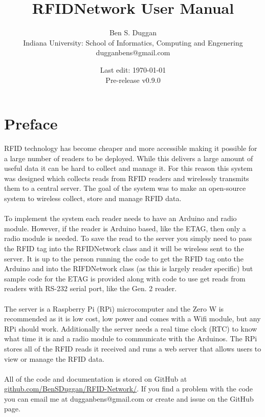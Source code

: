 \documentclass[12pt]{article}
\begin{document}
\begin{titlepage}
	\title{RFIDNetwork User Manual}
	\author{Ben S. Duggan\\Indiana University: School of Informatics, Computing and Engenering\\dugganbens@gmail.com}
	\date{Last edit: \today\\
	Pre-release v0.9.0}
\end{titlepage}

\maketitle
\tableofcontents
\pagebreak

\section{Preface}
RFID technology has become cheaper and more accessible making it possible for a large number of readers to be deployed.  While this delivers a large amount of useful data it can be hard to collect and manage it.  For this reason this system was designed which collects reads from RFID readers and wirelessly transmits them to a central server.  The goal of the system was to make an open-source system to wireless collect, store and manage RFID data.\\\\
To implement the system each reader needs to have an Arduino and radio module.  However, if the reader is Arduino based, like the ETAG, then only a radio module is needed.  To save the read to the server you simply need to pass the RFID tag into the RFIDNetwork class and it will be wireless sent to the server.  It is up to the person running the code to get the RFID tag onto the Arduino and into the RIFDNetwork class (as this is largely reader specific) but sample code for the ETAG is provided along with code to use get reads from readers with RS-232 serial port, like the Gen. 2 reader.\\\\
The server is a Raspberry Pi (RPi) microcomputer and the Zero W is recommended as it is low cost, low power and comes with a Wifi module, but any RPi should work.  Additionally the server needs a real time clock (RTC) to know what time it is and a radio module to communicate with the Arduinos.  The RPi stores all of the RFID reads it received and runs a web server that allows users to view or manage the RFID data.\\\\
All of the code and documentation is stored on GitHub at \href{https://github.com/BenSDuggan/RFID-Network/}{github.com/BenSDuggan/RFID-Network/}.  If you find a problem with the code you can email me at dugganbens@gmail.com or create and issue on the GitHub page.\\
\end{document}
